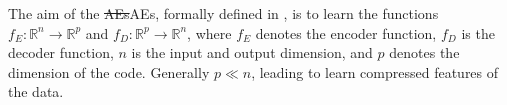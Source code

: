 \documentclass[journal,article,submit,pdftex,moreauthors]{Definitions/mdpi}
\providecommand{\DIFdel}[1]{{\protect\color{red}\sout{#1}}}                      %
\providecommand{\DIFaddbegin}{} %
\providecommand{\DIFaddend}{} %
\providecommand{\DIFdelbegin}{} %
\providecommand{\DIFdelend}{} %
\begin{document}
The aim of the \DIFdelbegin \DIFdel{AEs}\DIFdelend \DIFaddbegin \ac{AEs}\DIFaddend , formally defined in \cite{Baldi2012}, is to learn  the functions $f_{E}: \mathbb{R}^{n} \to \mathbb{R}^{p} $ and $f_{D}: \mathbb{R}^{p} \to \mathbb{R}^{n}$, where $f_{E}$ denotes the encoder function, $f_{D}$ is the decoder function, $n$ is the input and output dimension, and $p$ denotes the dimension of the code.
Generally $p \ll n$, leading to learn compressed features of the data. 




\end{document}
